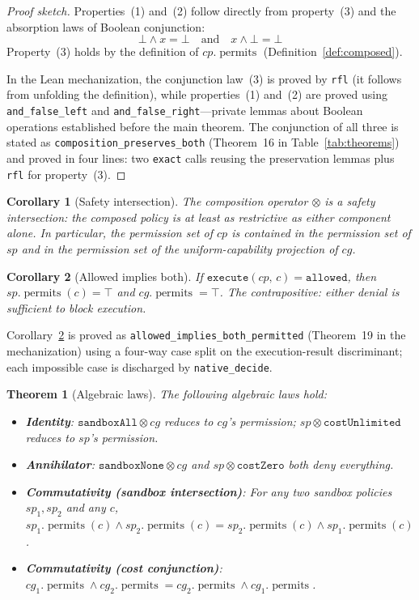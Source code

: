 \documentclass[sigconf]{acmart}
\newtheorem{theorem}{Theorem}
\newtheorem{corollary}{Corollary}
\newcommand{\compose}{\mathbin{\otimes}}
\newcommand{\permits}{\operatorname{permits}}
\newcommand{\SP}{\mathit{sp}}
\newcommand{\CG}{\mathit{cg}}
\newcommand{\CP}{\mathit{cp}}
\begin{document}
\begin{proof}[Proof sketch]
Properties~(1) and~(2) follow directly from property~(3) and the
absorption laws of Boolean conjunction:
\[
  \bot \wedge x = \bot \quad \text{and} \quad x \wedge \bot = \bot
\]
Property~(3) holds by the definition of $\CP.\permits$ (Definition~\ref{def:composed}).

In the Lean mechanization, the conjunction law~(3) is proved by \texttt{rfl}
(it follows from unfolding the definition), while properties~(1) and~(2) are
proved using \texttt{and\_false\_left} and \texttt{and\_false\_right}---private
lemmas about Boolean operations established before the main theorem.  The
conjunction of all three is stated as \texttt{composition\_preserves\_both}
(Theorem~16 in Table~\ref{tab:theorems}) and proved in four lines:
two \texttt{exact} calls reusing the preservation lemmas plus \texttt{rfl}
for property~(3).
\end{proof}

\begin{corollary}[Safety intersection]
\label{cor:safety}
The composition operator $\compose$ is a \emph{safety intersection}: the
composed policy is at least as restrictive as either component alone.  In
particular, the permission set of $\CP$ is contained in the permission set of
$\SP$ and in the permission set of the uniform-capability projection of $\CG$.
\end{corollary}

\begin{corollary}[Allowed implies both]
\label{cor:allowed}
If $\mathtt{execute}(\CP,\,c) = \mathtt{allowed}$, then $\SP.\permits(c) = \top$
and $\CG.\permits = \top$.  The contrapositive: either denial is sufficient to
block execution.
\end{corollary}

Corollary~\ref{cor:allowed} is proved as \texttt{allowed\_implies\_both\_permitted}
(Theorem~19 in the mechanization) using a four-way case split on the
execution-result discriminant; each impossible case is discharged by
\texttt{native\_decide}.

\begin{theorem}[Algebraic laws]
\label{thm:laws}
The following algebraic laws hold:

\begin{itemize}
  \item \textbf{Identity}: $\mathtt{sandboxAll} \compose \CG$ reduces to
        $\CG$'s permission; $\SP \compose \mathtt{costUnlimited}$ reduces to
        $\SP$'s permission.
  \item \textbf{Annihilator}: $\mathtt{sandboxNone} \compose \CG$ and
        $\SP \compose \mathtt{costZero}$ both deny everything.
  \item \textbf{Commutativity (sandbox intersection)}: For any two sandbox
        policies $\SP_1, \SP_2$ and any $c$,
        $\SP_1.\permits(c) \wedge \SP_2.\permits(c) = \SP_2.\permits(c) \wedge \SP_1.\permits(c)$.
  \item \textbf{Commutativity (cost conjunction)}:
        $\CG_1.\permits \wedge \CG_2.\permits = \CG_2.\permits \wedge \CG_1.\permits$.
\end{itemize}
\end{theorem}
\end{document}
